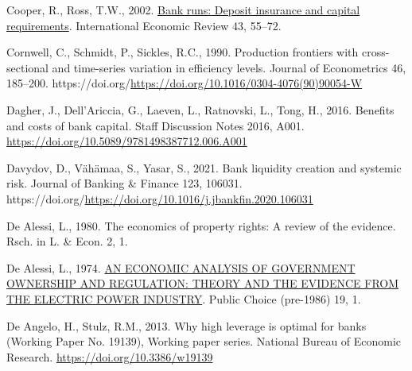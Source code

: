 \documentclass[
  letterpaper,
  DIV=11,
  numbers=noendperiod]{scrreprt}
\newlength{\cslhangindent}
\newenvironment{CSLReferences}[2] %
 {\begin{list}{}{%
  \setlength{\itemindent}{0pt}
  \setlength{\leftmargin}{0pt}
  \setlength{\parsep}{0pt}
  \ifodd #1
   \setlength{\leftmargin}{\cslhangindent}
   \setlength{\itemindent}{-1\cslhangindent}
  \fi
  \setlength{\itemsep}{#2\baselineskip}}}
 {\end{list}}
\begin{document}
\begin{CSLReferences}{1}{0}
Cooper, R., Ross, T.W., 2002.
\href{http://www.jstor.org.queens.ezp1.qub.ac.uk/stable/827056}{Bank
runs: Deposit insurance and capital requirements}. International
Economic Review 43, 55--72.

Cornwell, C., Schmidt, P., Sickles, R.C., 1990. Production frontiers
with cross-sectional and time-series variation in efficiency levels.
Journal of Econometrics 46, 185--200.
https://doi.org/\url{https://doi.org/10.1016/0304-4076(90)90054-W}

Dagher, J., Dell'Ariccia, G., Laeven, L., Ratnovski, L., Tong, H., 2016.
Benefits and costs of bank capital. Staff Discussion Notes 2016, A001.
\url{https://doi.org/10.5089/9781498387712.006.A001}

Davydov, D., Vähämaa, S., Yasar, S., 2021. Bank liquidity creation and
systemic risk. Journal of Banking \& Finance 123, 106031.
https://doi.org/\url{https://doi.org/10.1016/j.jbankfin.2020.106031}

De Alessi, L., 1980. The economics of property rights: A review of the
evidence. Rsch. in L. \& Econ. 2, 1.

De Alessi, L., 1974.
\href{https://queens.ezp1.qub.ac.uk/login?url=https://www.proquest.com/scholarly-journals/economic-analysis-government-ownership-regulation/docview/236987376/se-2?accountid=13374\%0Ahttps://resolver.ebscohost.com/openurl?ctx_ver=Z39.88-2004&ctx_enc=info:ofi/enc:UTF-8&rfr_id=info:sid/ProQ\%3Aabiglobal&rft_val_fmt=info:ofi/fmt:kev:mtx:journal&rft.genre=unknown&rft.jtitle=Public+Choice+\%28pre-1986\%29&rft.atitle=AN+ECONOMIC+ANALYSIS+OF+GOVERNMENT+OWNERSHIP+AND+REGULATION\%3A+THEORY+AND+THE+EVIDENCE+FROM+THE+ELECTRIC+POWER+INDUSTRY&rft.au=De+Alessi\%2C+Louis&rft.aulast=De+Alessi&rft.aufirst=Louis&rft.date=1974-10-01&rft.volume=19&rft.issue=&rft.spage=1&rft.isbn=&rft.btitle=&rft.title=Public+Choice+\%28pre-1986\%29&rft.issn=00485829&rft_id=info:doi/}{AN
ECONOMIC ANALYSIS OF GOVERNMENT OWNERSHIP AND REGULATION: THEORY AND THE
EVIDENCE FROM THE ELECTRIC POWER INDUSTRY}. Public Choice (pre-1986) 19,
1.

De Angelo, H., Stulz, R.M., 2013. Why high leverage is optimal for banks
(Working Paper No. 19139), Working paper series. National Bureau of
Economic Research. \url{https://doi.org/10.3386/w19139}


\end{CSLReferences}
\end{document}

